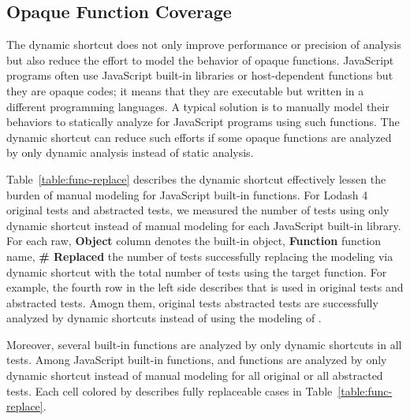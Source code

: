 \subsection{Opaque Function Coverage}

The dynamic shortcut does not only improve performance or precision of analysis
but also reduce the effort to model the behavior of opaque functions.
JavaScript programs often use JavaScript built-in libraries or host-dependent
functions but they are opaque codes; it means that they are executable but
written in a different programming languages.  A typical solution is to
manually model their behaviors to statically analyze for JavaScript programs
using such functions.  The dynamic shortcut can reduce such efforts if some
opaque functions are analyzed by only dynamic analysis instead of static
analysis.

Table~\ref{table:func-replace} describes the dynamic shortcut effectively lessen
the burden of manual modeling for JavaScript built-in functions.  For Lodash 4
 original tests and  abstracted tests, we measured the
number of tests using only dynamic shortcut instead of manual modeling for each
JavaScript built-in library.  For each raw, \textbf{Object} column denotes the
built-in object, \textbf{Function} function name, \textbf{\# Replaced} the
number of tests successfully replacing the modeling via dynamic shortcut with
the total number of tests using the target function.  For example, the fourth
row in the left side describes that  is used in
 original tests and  abstracted tests. Amogn them,
 original tests  abstracted tests are successfully analyzed
by dynamic shortcuts instead of using the modeling of
.

Moreover, several built-in functions are analyzed by only dynamic shortcuts in
all tests.  Among  JavaScript built-in functions,  and
 functions are analyzed by only dynamic shortcut instead of manual
modeling for all original or all abstracted tests.  Each cell colored by
 describes fully replaceable cases in
Table~\ref{table:func-replace}.
